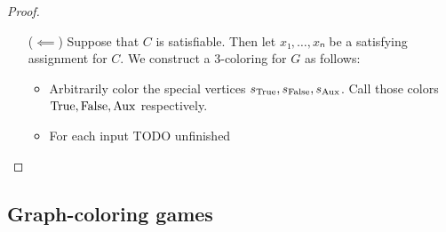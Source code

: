\documentclass{report-snippet}
\begin{document}
\begin{proof}
\begin{itemize}
    \item[(\(⟸\))] Suppose that \(C\) is satisfiable.  Then let
      \(x₁,\dotsc,xₙ\) be a satisfying assignment for \(C\).  We construct a
      3-coloring for \(G\) as follows:
      \begin{itemize}
        \item Arbitrarily color the special vertices
          \(s_{\mathrm{True}},s_{\mathrm{False}},s_{\mathrm{Aux}}\).  Call those colors \(\mathrm{True},\mathrm{False},{\mathrm{Aux}}\)
          respectively.
        \item For each input TODO unfinished
      \end{itemize}
      

  \end{itemize}


\end{proof}



\subsection{Graph-coloring games}
\end{document}
